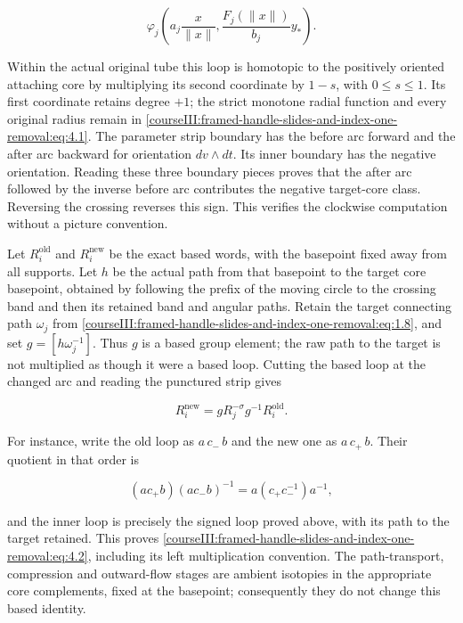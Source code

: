 \begin{equation}
\varphi_j\left(a_j\frac{x}{\|x\|},
                   \frac{F_j(\|x\|)}{b_j}y_*\right).
 \label{courseIII:framed-handle-slides-and-index-one-removal:eq:4.1}
\end{equation}

Within the actual original tube this loop is homotopic to the positively oriented attaching core by multiplying its second coordinate by \(1-s\), with \(0\leq s\leq1\). Its first coordinate retains degree \(+1\); the strict monotone radial function and every original radius remain in \eqref{courseIII:framed-handle-slides-and-index-one-removal:eq:4.1}. The parameter strip boundary has the before arc forward and the after arc backward for orientation \(dv\wedge dt\). Its inner boundary has the negative orientation. Reading these three boundary pieces proves that the after arc followed by the inverse before arc contributes the negative target-core class. Reversing the crossing reverses this sign. This verifies the clockwise computation without a picture convention.

Let \(R_i^{\mathrm{old}}\) and \(R_i^{\mathrm{new}}\) be the exact based words, with the basepoint fixed away from all supports. Let \(h\) be the actual path from that basepoint to the target core basepoint, obtained by following the prefix of the moving circle to the crossing band and then its retained band and angular paths. Retain the target connecting path \(\omega_j\) from \eqref{courseIII:framed-handle-slides-and-index-one-removal:eq:1.8}, and set \(g=[h\omega_j^{-1}]\). Thus \(g\) is a based group element; the raw path to the target is not multiplied as though it were a based loop. Cutting the based loop at the changed arc and reading the punctured strip gives

\begin{equation}
R_i^{\mathrm{new}}
     =g R_j^{-\sigma}g^{-1}R_i^{\mathrm{old}}.
 \label{courseIII:framed-handle-slides-and-index-one-removal:eq:4.2}
\end{equation}

For instance, write the old loop as \(a\,c_-\,b\) and the new one as \(a\,c_+\,b\). Their quotient in that order is

\begin{equation}
(a c_+ b)(a c_- b)^{-1}
       =a(c_+c_-^{-1})a^{-1},
 \label{courseIII:framed-handle-slides-and-index-one-removal:eq:4.3}
\end{equation}

and the inner loop is precisely the signed loop proved above, with its path to the target retained. This proves \eqref{courseIII:framed-handle-slides-and-index-one-removal:eq:4.2}, including its left multiplication convention. The path-transport, compression and outward-flow stages are ambient isotopies in the appropriate core complements, fixed at the basepoint; consequently they do not change this based identity.

